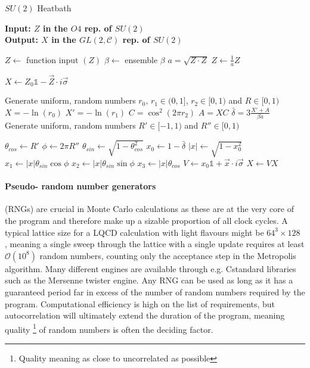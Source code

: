 \documentclass[a4paper,10pt]{book}
\newcommand{\CC}{C\nolinebreak\hspace{-.05em}\raisebox{.4ex}{\tiny\bf +}\nolinebreak\hspace{-.10em}\raisebox{.4ex}{\tiny\bf +}}
\def\CC{{C\nolinebreak[4]\hspace{-.05em}\raisebox{.4ex}{\tiny\bf ++}}}
\begin{document}
\begin{algorithm}
\caption{$SU(2)$ Heatbath}\label{alg:SU2HB}
\hspace*{\algorithmicindent} \textbf{Input: $Z$ in the $O4$ rep. of $SU(2)$} \\
\hspace*{\algorithmicindent} \textbf{Output: $X$ in the $GL(2,\mathcal{C})$ rep. of $SU(2)$}
\begin{algorithmic}
\Ensure
\State $Z \gets $ function input $(Z)$
\State $\beta \gets $ ensemble $\beta$
\State $a=\sqrt{Z\cdot Z}$
\State $Z \gets \frac{1}{a}Z$

\State $X \gets Z_0\mathbb{1}-\vec{Z}\cdot i\vec{\sigma}$

\State Generate uniform, random numbers $r_0,\,r_1 \in (0,1]$,  $r_2 \in [0,1)$ and $R \in [0,1)$
\State $X = -\operatorname{ln}(r_0)$
\State $X' = -\operatorname{ln}(r_1)$
\State $C = \cos^2\left( 2\pi r_2 \right)$
\State $A = XC$
\State $\bar{\delta} = 3\frac{X'+A}{\beta a}$
\EndWhile
\State Generate uniform, random numbers $R'\in [-1,1)$ and $R'' \in [0,1)$

\State $\theta_{cos} \gets R'$
\State $\phi \gets 2\pi R''$
\State $\theta_{sin} \gets \sqrt{1-\theta_{cos}^2}$
\State $x_0 \gets 1-\bar{\delta}$
\State $|x| \gets \sqrt{1-x_0^2}$
\State $x_1 \gets |x|\theta_{sin}\cos{\phi}$
\State $x_2 \gets |x|\theta_{sin}\sin{\phi}$
\State $x_3 \gets |x|\theta_{cos}$
\State $V \gets x_0\mathbb{1}+\vec{x}\cdot i\vec{\sigma}$
\State $X\gets VX$
\end{algorithmic}
\end{algorithm}

\paragraph{Pseudo- random number generators} (RNGs) are crucial in Monte Carlo calculations as these are at the very core of the program and therefore make up a sizable proportion of all clock cycles. A typical lattice size for a LQCD calculation with light flavours might be $64^3\times 128$ \cite{tanabashi2018review}, meaning a single sweep through the lattice with a single update requires at least $\mathcal{O}(10^8)$ random numbers, counting only the acceptance step in the Metropolis algorithm. Many different engines are available through e.g. \CC standard libraries such as the Mersenne twister engine. Any RNG can be used as long as it has a guaranteed period far in excess of the number of random numbers required by the program. Computational efficiency is high on the list of requirements, but autocorrelation will ultimately extend the duration of the program, meaning quality \footnote{Quality meaning as close to uncorrelated as possible} of random numbers is often the deciding factor.
\end{document}
